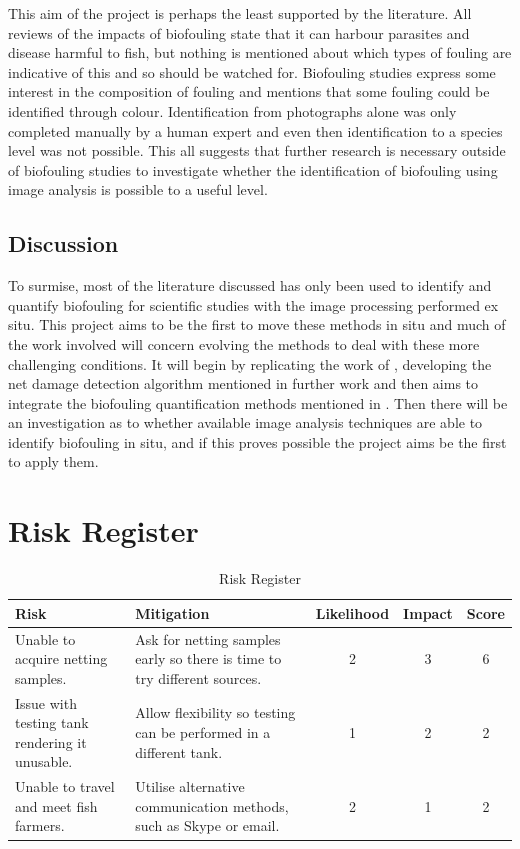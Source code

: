 \documentclass[11.5pt, twoside, a4paper]{article}
\begin{document}
This aim of the project is perhaps the least supported by the literature. All reviews of the impacts of biofouling \cite{beveridge2008cage,braithwaite2004marine,fitridge2012impact} state that it can harbour parasites and disease harmful to fish, but nothing is mentioned about which types of fouling are indicative of this and so should be watched for. Biofouling studies express some interest in the composition of fouling and \cite{hodson1995situ} mentions that some fouling could be identified through colour. Identification from photographs alone \cite{edwards2015effectiveness,guenther2010development} was only completed manually by a human expert and even then identification to a species level was not possible. This all suggests that further research is necessary outside of biofouling studies to investigate whether the identification of biofouling using image analysis is possible to a useful level.

\subsection{Discussion}

To surmise, most of the literature discussed has only been used to identify and quantify biofouling for scientific studies with the image processing performed ex situ. This project aims to be the first to move these methods in situ and much of the work involved will concern evolving the methods to deal with these more challenging conditions. It will begin by replicating the work of \cite{jakobsen2011automatic}, developing the net damage detection algorithm mentioned in further work and then aims to integrate the biofouling quantification methods mentioned in \cite{hodson1995situ,guenther2010development}. Then there will be an investigation as to whether available image analysis techniques are able to identify biofouling in situ, and if this proves possible the project aims be the first to apply them.

\section{Risk Register}

\begin{table}[h]
\centering 
\begin{tabular}{|p{4.5cm}|p{5cm} |c |c| c|} \hline
Risk & Mitigation & Likelihood & Impact & Score \\ [0.5ex] 
\hline 
Unable to acquire netting samples. & Ask for netting samples early so there is time to try different sources. & 2 & 3 & 6\\
\hline
Issue with testing tank rendering it unusable. & Allow flexibility so testing can be performed in a different tank. & 1 & 2 & 2\\
\hline
Unable to travel and meet fish farmers. & Utilise alternative communication methods, such as Skype or email. & 2 & 1 & 2\\
\hline
\end{tabular}
\label{table:risks} 
\caption{Risk Register} 
\end{table}
\end{document}
